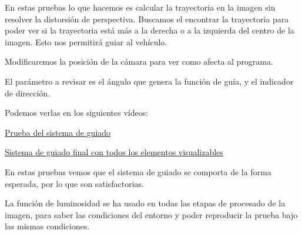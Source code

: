 \begin{itemize}
	En estas pruebas lo que hacemos es calcular la trayectoria en la imagen sin resolver la distorsión de perspectiva. Buscamos el encontrar la trayectoria para poder ver si la trayectoria está más a la derecha o a la izquierda del centro de la imagen. Esto nos permitirá guiar al vehículo. 
	
	Modificaremos la posición de la cámara para ver como afecta al programa.
	
El parámetro a revisar es el ángulo que genera la función de guía, y el indicador de dirección.	
	
	Podemos verlas en los siguientes vídeos:
	
	\href{https://youtu.be/ODr3q91MLk0}{Prueba del sistema de guiado}
	
	\href{https://youtu.be/8j69cDydXfA}{Sistema de guiado final con todos los elementos visualizables}
	
	En estas pruebas vemos que el sistema de guiado se comporta de la forma esperada, por lo que son satisfactorias.
	
\end{itemize}

La función de luminosidad se ha usado en todas las etapas de procesado de la imagen, para saber las condiciones del entorno y poder reproducir la prueba bajo las mismas condiciones.
